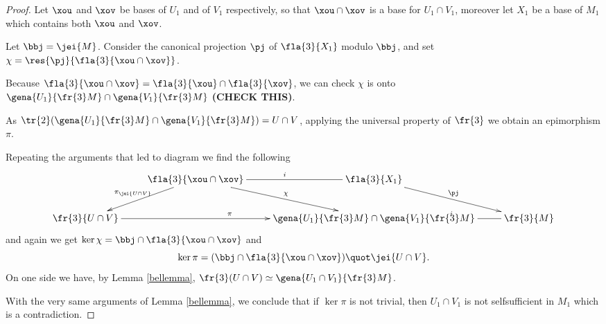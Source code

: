 \begin{proof}

Let $\xou$ and $\xov$ be bases of $U_{1}$ and of $V_{1}$ respectively, so that $\xou\cap\xov$ is a base for $U_{1}\cap V_{1}$, moreover let $X_{1}$ be a base of $M_{1}$ which contains both $\xou$ and $\xov$.

Let $\bbj=\jei{M}$. Consider the canonical projection $\pj$ of $\fla{3}{X_{1}}$ modulo $\bbj$, and set $\chi=
\res{\pj}{\fla{3}{\xou\cap\xov}}$.

Because $\fla{3}{\xou\cap\xov}=\fla{3}{\xou}\cap\fla{3}{\xov}$, we can check $\chi$ is onto
$\gena{U_{1}}{\fr{3}M}\cap\gena{V_{1}}{\fr{3}M}$  {\bf(CHECK THIS)}.

As $\tr{2}(\gena{U_{1}}{\fr{3}M}\cap\gena{V_{1}}{\fr{3}M})=U\cap V$, applying the universal property of $\fr{3}$ we obtain an epimorphism $\pi$.

Repeating the arguments that led to diagram  we find the following
$$
\xymatrix{&\fla{3}{\xou\cap\xov}\ar[dl]_{\pi_{\jei{U\cap V}}}\ar[dr]^{\chi}\ar@{-}[r]^{i}&\fla{3}{X_1}\ar[dr]^{\pj}\\
\fr{3}{U\cap V}\ar[rr]^{\pi}&&\gena{U_{1}}{\fr{3}M}\cap\gena{V_{1}}{\fr{3}M}\ar@{-}[r]^{i}&\fr{3}{M}}
$$
and again we get $\ker\chi=\bbj\cap\fla{3}{\xou\cap\xov}$ and
$$
\ker\pi=(\bbj\cap\fla{3}{\xou\cap\xov})\quot\jei{U\cap V}.
$$
On one side we have, by Lemma \ref{bellemma}, $\fr{3}(U\cap V)\simeq\gena{U_{1}\cap V_{1}}{\fr{3}M}$.

With the very same arguments of Lemma \ref{bellemma}, we conclude that if $\ker\pi$ is not trivial, then $U_{1}
\cap V_{1}$ is not selfsufficient in $M_{1}$ which is a contradiction.
\end{proof}
